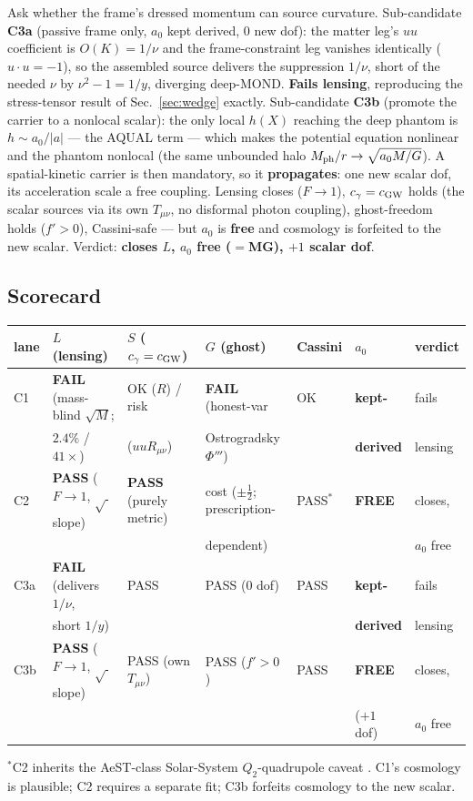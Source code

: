 \documentclass[11pt]{article}
\newcommand{\cgw}{c_{\rm GW}}
\newcommand{\Mph}{M_{\rm ph}}
\begin{document}
Ask whether the frame's dressed momentum can source curvature. Sub-candidate \textbf{C3a} (passive frame only, $a_0$ kept derived, 0 new dof): the matter leg's $uu$ coefficient is $O(K)=1/\nu$ and the frame-constraint leg vanishes identically ($u\cdot u=-1$), so the assembled source delivers the suppression $1/\nu$, short of the needed $\nu$ by $\nu^2-1=1/y$, diverging deep-MOND. \textbf{Fails lensing}, reproducing the stress-tensor result of Sec.~\ref{sec:wedge} exactly. Sub-candidate \textbf{C3b} (promote the carrier to a nonlocal scalar): the only local $h(X)$ reaching the deep phantom is $h\sim a_0/|a|$ --- the AQUAL term --- which makes the potential equation nonlinear and the phantom nonlocal (the same unbounded halo $\Mph/r\to\sqrt{a_0M/G}$). A spatial-kinetic carrier is then mandatory, so it \textbf{propagates}: one new scalar dof, its acceleration scale a free coupling. Lensing closes ($F\to1$), $c_\gamma=\cgw$ holds (the scalar sources via its own $T_{\mu\nu}$, no disformal photon coupling), ghost-freedom holds ($f'>0$), Cassini-safe --- but $a_0$ is \textbf{free} and cosmology is forfeited to the new scalar. Verdict: \textbf{closes $L$, $a_0$ free ($=$MG), $+1$ scalar dof}.

\subsection{Scorecard}

\begin{center}
\footnotesize
\begin{tabular}{lllllll}
\toprule
lane & $L$ (lensing) & $S$ ($c_\gamma=\cgw$) & $G$ (ghost) & Cassini & $a_0$ & verdict\\
\midrule
C1 & \textbf{FAIL} (mass-blind $\sqrt M$; & OK ($R$) / risk & \textbf{FAIL} (honest-var & OK & \textbf{kept-} & fails\\
 & $2.4\%$ / $41\times$) & ($uuR_{\mu\nu}$) & Ostrogradsky $\Phi'''$) & & \textbf{derived} & lensing\\
C2 & \textbf{PASS} ($F\to1$, $\sqrt{\ }$ slope) & \textbf{PASS} (purely metric) & cost ($\pm\tfrac12$; prescription- & PASS$^{*}$ & \textbf{FREE} & closes,\\
 & & & dependent) & & & $a_0$ free\\
C3a & \textbf{FAIL} (delivers $1/\nu$, & PASS & PASS (0 dof) & PASS & \textbf{kept-} & fails\\
 & short $1/y$) & & & & \textbf{derived} & lensing\\
C3b & \textbf{PASS} ($F\to1$, $\sqrt{\ }$ slope) & PASS (own $T_{\mu\nu}$) & PASS ($f'>0$) & PASS & \textbf{FREE} & closes,\\
 & & & & & ($+1$ dof) & $a_0$ free\\
\bottomrule
\end{tabular}

\smallskip
{\footnotesize $^{*}$C2 inherits the AeST-class Solar-System $Q_2$-quadrupole caveat \cite{desmond2024,park2026}. C1's cosmology is plausible; C2 requires a separate fit; C3b forfeits cosmology to the new scalar.}
\end{center}
\end{document}
